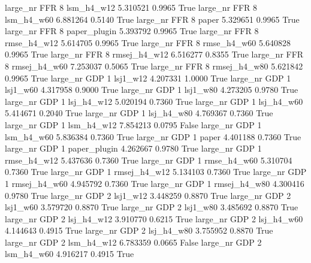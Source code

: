   large_nr      FFR                 8   lsm_h4_w12    5.310521      0.9965    True
  large_nr      FFR                 8   lsm_h4_w60    6.881264      0.5140    True
  large_nr      FFR                 8        paper    5.329651      0.9965    True
  large_nr      FFR                 8 paper_plugin    5.393792      0.9965    True
  large_nr      FFR                 8  rmse_h4_w12    5.614705      0.9965    True
  large_nr      FFR                 8  rmse_h4_w60    5.640828      0.9965    True
  large_nr      FFR                 8 rmsej_h4_w12    6.516277      0.8355    True
  large_nr      FFR                 8 rmsej_h4_w60    7.253037      0.5065    True
  large_nr      FFR                 8 rmsej_h4_w80    5.621842      0.9965    True
  large_nr      GDP                 1     lsj1_w12    4.207331      1.0000    True
  large_nr      GDP                 1     lsj1_w60    4.317958      0.9000    True
  large_nr      GDP                 1     lsj1_w80    4.273205      0.9780    True
  large_nr      GDP                 1   lsj_h4_w12    5.020194      0.7360    True
  large_nr      GDP                 1   lsj_h4_w60    5.414671      0.2040    True
  large_nr      GDP                 1   lsj_h4_w80    4.769367      0.7360    True
  large_nr      GDP                 1   lsm_h4_w12    7.854213      0.0795   False
  large_nr      GDP                 1   lsm_h4_w60    5.836384      0.7360    True
  large_nr      GDP                 1        paper    4.401188      0.7360    True
  large_nr      GDP                 1 paper_plugin    4.262667      0.9780    True
  large_nr      GDP                 1  rmse_h4_w12    5.437636      0.7360    True
  large_nr      GDP                 1  rmse_h4_w60    5.310704      0.7360    True
  large_nr      GDP                 1 rmsej_h4_w12    5.134103      0.7360    True
  large_nr      GDP                 1 rmsej_h4_w60    4.945792      0.7360    True
  large_nr      GDP                 1 rmsej_h4_w80    4.300416      0.9780    True
  large_nr      GDP                 2     lsj1_w12    3.448259      0.8870    True
  large_nr      GDP                 2     lsj1_w60    3.579720      0.8870    True
  large_nr      GDP                 2     lsj1_w80    3.485692      0.8870    True
  large_nr      GDP                 2   lsj_h4_w12    3.910770      0.6215    True
  large_nr      GDP                 2   lsj_h4_w60    4.144643      0.4915    True
  large_nr      GDP                 2   lsj_h4_w80    3.755952      0.8870    True
  large_nr      GDP                 2   lsm_h4_w12    6.783359      0.0665   False
  large_nr      GDP                 2   lsm_h4_w60    4.916217      0.4915    True
